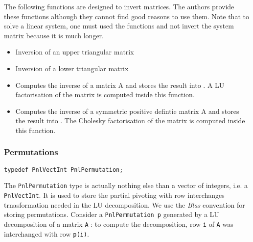 The following functions are designed to invert matrices. The authors provide
these functions although they cannot find good reasons to use them. Note that
to solve a linear system, one must used the  functions and not
invert the system matrix because it is much longer.
\begin{itemize}
\item {}
  \sshortdescribe Inversion of an upper triangular matrix  

\item {}
  \sshortdescribe Inversion of a lower triangular matrix  

\item {}
  \sshortdescribe Computes the inverse of a matrix A and stores the result
  into . A LU factorisation of the matrix  is computed
  inside this function.
\item {}
  \sshortdescribe Computes the inverse of a symmetric positive defintie matrix
  A and stores the result into . The Cholesky factorisation of
  the matrix  is computed inside this function.
\end{itemize}

\subsubsection{Permutations}

\begin{verbatim}
typedef PnlVectInt PnlPermutation;
\end{verbatim}

The \verb!PnlPermutation! type is actually nothing else than a vector of
integers, i.e. a \verb!PnlVectInt!. It is used to store the partial pivoting
with row interchanges trnasformation needed in the LU decomposition.  We use the
{\it Blas} convention for storing permutations. Consider a \verb!PnlPermutation p!
generated by a LU decomposition of a matrix \verb!A! : to compute the
decomposition, row \verb!i! of \verb!A! was interchanged with row \verb!p(i)!.


